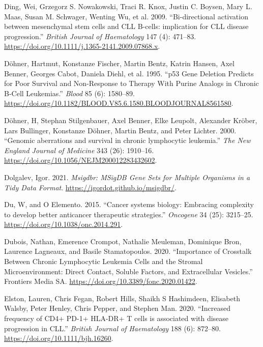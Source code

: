 \documentclass[11pt, a4paper, twosided]{book}
\newenvironment{CSLReferences}%
  {}%
  {\par}
\begin{document}
\begin{CSLReferences}{1}{0}
\leavevmode{}%
Ding, Wei, Grzegorz S. Nowakowski, Traci R. Knox, Justin C. Boysen, Mary L. Maas, Susan M. Schwager, Wenting Wu, et al. 2009. {``{Bi-directional activation between mesenchymal stem cells and CLL B-cells: implication for CLL disease progression}.''} \emph{British Journal of Haematology} 147 (4): 471--83. \url{https://doi.org/10.1111/j.1365-2141.2009.07868.x}.

\leavevmode{}%
Döhner, Hartmut, Konstanze Fischer, Martin Bentz, Katrin Hansen, Axel Benner, Georges Cabot, Daniela Diehl, et al. 1995. {``{p53 Gene Deletion Predicts for Poor Survival and Non-Response to Therapy With Purine Analogs in Chronic B-Cell Leukemias}.''} \emph{Blood} 85 (6): 1580--89. \url{https://doi.org/10.1182/BLOOD.V85.6.1580.BLOODJOURNAL8561580}.

\leavevmode{}%
Döhner, H, Stephan Stilgenbauer, Axel Benner, Elke Leupolt, Alexander Kröber, Lars Bullinger, Konstanze Döhner, Martin Bentz, and Peter Lichter. 2000. {``{Genomic aberrations and survival in chronic lymphocytic leukemia.}''} \emph{The New England Journal of Medicine} 343 (26): 1910--16. \url{https://doi.org/10.1056/NEJM200012283432602}.

\leavevmode{}%
Dolgalev, Igor. 2021. \emph{Msigdbr: MSigDB Gene Sets for Multiple Organisms in a Tidy Data Format}. \url{https://igordot.github.io/msigdbr/}.

\leavevmode{}%
Du, W, and O Elemento. 2015. {``{Cancer systems biology: Embracing complexity to develop better anticancer therapeutic strategies}.''} \emph{Oncogene} 34 (25): 3215--25. \url{https://doi.org/10.1038/onc.2014.291}.

\leavevmode{}%
Dubois, Nathan, Emerence Crompot, Nathalie Meuleman, Dominique Bron, Laurence Lagneaux, and Basile Stamatopoulos. 2020. {``{Importance of Crosstalk Between Chronic Lymphocytic Leukemia Cells and the Stromal Microenvironment: Direct Contact, Soluble Factors, and Extracellular Vesicles}.''} Frontiers Media SA. \url{https://doi.org/10.3389/fonc.2020.01422}.

\leavevmode{}%
Elston, Lauren, Chris Fegan, Robert Hills, Shaikh S Hashimdeen, Elisabeth Walsby, Peter Henley, Chris Pepper, and Stephen Man. 2020. {``{Increased frequency of CD4+ PD-1+ HLA-DR+ T cells is associated with disease progression in CLL.}''} \emph{British Journal of Haematology} 188 (6): 872--80. \url{https://doi.org/10.1111/bjh.16260}.


\end{CSLReferences}
\end{document}
